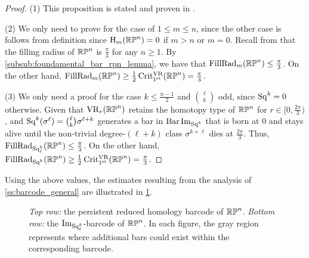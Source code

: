 \begin{proof}
	(1) This proposition is stated and proven in \cite[Thm.~4.5]{adams2022metric}.

	(2) We only need to prove for the case of $1\leq m\leq n$, since the other case is follows from definition since \(\mathrm{H}_m(\mathbb{RP}^n) = 0\) if \(m > n\) or \(m = 0\).
	Recall from \cite{katz1983filling} that the filling radius of $\mathbb{RP}^n$ is $\frac{\pi}{3}$ for any $n \geq 1$.
	By \cref{subsub:foundamental_bar_rpn_lemma}, we have that $\operatorname{FillRad}_{m}(\mathbb{RP}^n)\leq \tfrac{\pi}{3}$.
	On the other hand, $\operatorname{FillRad}_{m}(\mathbb{RP}^n)\geq \tfrac{1}{2}\operatorname{Crit^{\mathrm{VR}}_{1^{\mathrm{st}}}}(\mathbb{RP}^n) = \tfrac{\pi}{3}$.

	(3) We only need a proof for the case $k \leq \frac{n-1}{2}$ and $\binom{\ell}{k}$ odd, since \(\operatorname{Sq}^k = 0\) otherwise.
    Given that $\mathrm{VR}_r(\mathbb{RP}^n)$ retains the homotopy type of $\mathbb{RP}^n$ for $r \in [0,\tfrac{2\pi}{3})$,  and $\operatorname{Sq}^k(\sigma^\ell) = \binom{\ell}{k}\sigma^{\ell+k}$ generates a bar in $\operatorname{Bar} \operatorname{Im}_{\operatorname{Sq}^k}$ that is born at $0$ and stays alive until the non-trivial degree-$(\ell+k)$ class $\sigma^{k+\ell}$ dies at $\tfrac{2\pi}{3}$.
	Thus, $\operatorname{FillRad}_{\operatorname{Sq}_\ell^k}(\mathbb{RP}^n) \leq \tfrac{\pi}{3}$.
	On the other hand, $\operatorname{FillRad}_{\operatorname{Sq}^k}(\mathbb{RP}^n) \geq \tfrac{1}{2}\operatorname{Crit^{\mathrm{VR}}_{1^{\mathrm{st}}}}(\mathbb{RP}^n) = \tfrac{\pi}{3}$.
\end{proof}

Using the above values, the estimates resulting from the analysis of \cref{ss:barcode_general} are illustrated in \cref{fig:sq barcodes}.

\begin{figure}
	\centering
	
	\caption{\emph{Top row:} the persistent reduced homology barcode of $\mathbb{RP}^n$.
		\emph{Bottom row:} the $\operatorname{Im}_{\operatorname{Sq}_\ell^k}$-barcode of $\mathbb{RP}^n$.
        In each figure, the gray region represents where additional bars could exist within the corresponding barcode.
	}
	\label{fig:sq barcodes}
\end{figure}
